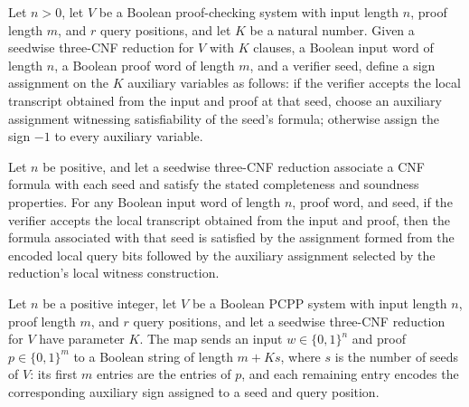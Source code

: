 \begin{definition}
\label{FABL.localAuxiliaryWitness}
\leanok
{}
Let $n>0$, let $V$ be a Boolean proof-checking system with input length $n$, proof
length $m$, and $r$ query positions, and let $K$ be a natural number. Given a seedwise
three-CNF reduction for $V$ with $K$ clauses, a Boolean input word of length $n$, a
Boolean proof word of length $m$, and a verifier seed, define a sign assignment on the
$K$ auxiliary variables as follows: if the verifier accepts the local transcript
obtained from the input and proof at that seed, choose an auxiliary assignment
witnessing satisfiability of the seed’s formula; otherwise assign the sign $-1$ to every
auxiliary variable.
\end{definition}

\begin{theorem}
\label{FABL.localAuxiliaryWitness_satisfies}
\leanok
{}
Let $n$ be positive, and let a seedwise three-CNF reduction associate a CNF formula with
each seed and satisfy the stated completeness and soundness properties. For any Boolean
input word of length $n$, proof word, and seed, if the verifier accepts the local
transcript obtained from the input and proof, then the formula associated with that seed
is satisfied by the assignment formed from the encoded local query bits followed by the
auxiliary assignment selected by the reduction’s local witness construction.
\end{theorem}

\begin{definition}
\label{FABL.composeThreeQueryProof}
\leanok
{}
Let $n$ be a positive integer, let $V$ be a Boolean PCPP system with input length $n$,
proof length $m$, and $r$ query positions, and let a seedwise three-CNF reduction for
$V$ have parameter $K$. The map sends an input $w\in\{0,1\}^n$ and proof $p\in\{0,1\}^m$
to a Boolean string of length $m+K s$, where $s$ is the number of seeds of $V$: its
first $m$ entries are the entries of $p$, and each remaining entry encodes the
corresponding auxiliary sign assigned to a seed and query position.
\end{definition}

